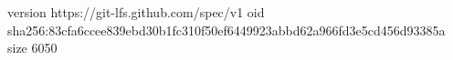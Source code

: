 version https://git-lfs.github.com/spec/v1
oid sha256:83cfa6ccee839ebd30b1fc310f50ef6449923abbd62a966fd3e5cd456d93385a
size 6050
